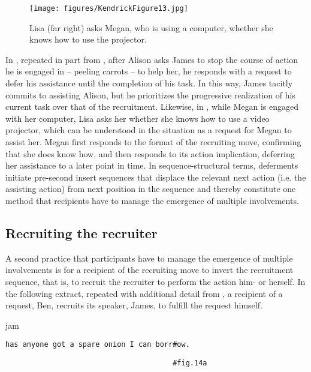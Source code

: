 \documentclass[output=paper,nonflat,modfont,draft]{langsci/langscibook}
\begin{document}
\begin{figure}
\caption{Lisa (far right) asks Megan, who is using a computer, whether she knows how to use the projector.}
\texttt{[image: figures/KendrickFigure13.jpg]}
\end{figure}

In , repeated in part from , after Alison asks James to stop the course of action he is engaged in -- peeling carrots -- to help her, he responds with a request to defer his assistance until the completion of his task. In this way, James tacitly commits to assisting Alison, but he prioritizes the progressive realization of his current task over that of the recruitment. Likewise, in , while Megan is engaged with her computer, Lisa asks her whether she knows how to use a video projector, which can be understood in the situation as a request for Megan to assist her. Megan first responds to the format of the recruiting move, confirming that she does know how, and then responds to its action implication, deferring her assistance to a later point in time. In sequence-structural terms, deferments initiate pre-second insert sequences that displace the relevant next action (i.e. the assisting action) from next position in the sequence \citep{Schegloff2007sequence} and thereby constitute one method that recipients have to manage the emergence of multiple involvements.

\subsection{Recruiting the recruiter}\label{sec:kendrick:5.3}
A second practice that participants have to manage the emergence of multiple involvements is for a recipient of the recruiting move to invert the recruitment sequence, that is, to recruit the recruiter to perform the action him- or herself. In the following extract, repeated with additional detail from , a recipient of a request, Ben, recruits its speaker, James, to fulfill the request himself.


\begin{transbox}{1}{jam}
\begin{verbatim}
has anyone got a spare onion I can borr#ow.
\end{verbatim}
\end{transbox}

\begin{transbox}{2}{\fig}
\begin{verbatim}
                                       #fig.14a
\end{verbatim}
\end{transbox}
\end{document}
